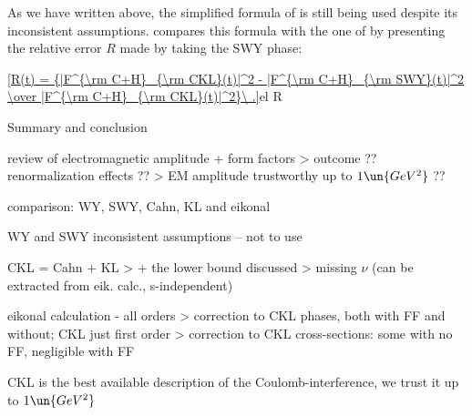 
As we have written above, the simplified formula of \WaY{} is still being used despite its inconsistent assumptions.  compares this formula with the one of \KaL{} by presenting the relative error $R$ made by taking the SWY phase:

\eqref{R(t) = {|F^{\rm C+H}_{\rm CKL}(t)|^2 - |F^{\rm C+H}_{\rm SWY}(t)|^2 \over |F^{\rm C+H}_{\rm CKL}(t)|^2}\ .}{el R}


\caption{Summary and conclusion}

\> review of electromagnetic amplitude + form factors
\>> outcome ?? renormalization effects ??
\>> EM amplitude trustworthy up to $1\un{GeV^2}$ ??

\> comparison: WY, SWY, Cahn, KL and eikonal

\> WY and SWY inconsistent assumptions -- not to use

\> CKL = Cahn + KL
\>> + the lower bound discussed
\>> missing $\nu$ (can be extracted from eik. calc., s-independent)

\> eikonal calculation - all orders
\>> correction to CKL phases, both with FF and without; CKL just first order
\>> correction to CKL cross-sections: some with no FF, negligible with FF

\> CKL is the best available description of the Coulomb-interference, we trust it up to $1\un{GeV^2}$
